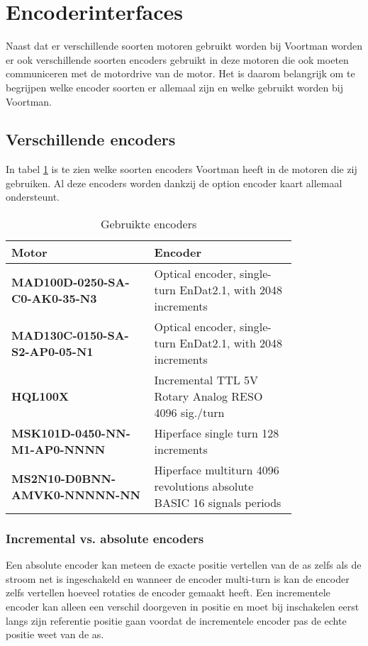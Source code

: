 \section{Encoderinterfaces}

Naast dat er verschillende soorten motoren gebruikt worden bij Voortman worden er ook verschillende soorten encoders gebruikt in deze motoren die ook moeten communiceren met de motordrive van de motor. Het is daarom belangrijk om te begrijpen welke encoder soorten er allemaal zijn en welke gebruikt worden bij Voortman.

\subsection{Verschillende encoders}

In tabel \ref{tab:GebruikteEncoders} is te zien welke soorten encoders Voortman heeft in de motoren die zij gebruiken. Al deze encoders worden dankzij de option encoder kaart allemaal ondersteunt.

\begin{table}[H]
	\caption{Gebruikte encoders}
	\label{tab:GebruikteEncoders}
	\centering
	\begin{tabular}{|p{0.4\linewidth}|p{0.4\linewidth}|}
		\hline
		\textbf{Motor} & \textbf{Encoder} \\
		\hline
		\textbf{MAD100D-0250-SA-C0-AK0-35-N3} & Optical encoder, single-turn EnDat2.1, with 2048 increments \\
		\textbf{MAD130C-0150-SA-S2-AP0-05-N1} & Optical encoder, single-turn EnDat2.1, with 2048 increments \\
		\textbf{HQL100X} & Incremental TTL 5V Rotary Analog RESO 4096 sig./turn \\
		\textbf{MSK101D-0450-NN-M1-AP0-NNNN} & Hiperface single turn 128 increments \\
		\textbf{MS2N10-D0BNN-AMVK0-NNNNN-NN} & Hiperface multiturn 4096 revolutions absolute BASIC 16 signals periods \\
		\hline
	\end{tabular}
\end{table}

\newpage

\subsubsection{Incremental vs. absolute encoders}

Een absolute encoder kan meteen de exacte positie vertellen van de as zelfs als de stroom net is ingeschakeld en wanneer de encoder multi-turn is kan de encoder zelfs vertellen hoeveel rotaties de encoder gemaakt heeft. Een incrementele encoder kan alleen een verschil doorgeven in positie en moet bij inschakelen eerst langs zijn referentie positie gaan voordat de incrementele encoder pas de echte positie weet van de as. \cite{web:EncoderDifference}

